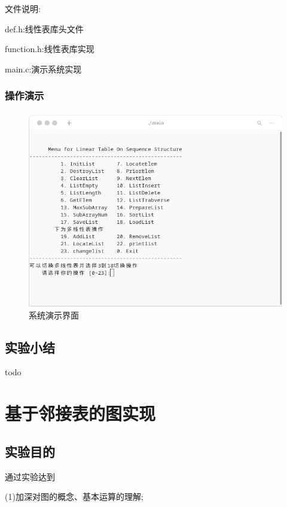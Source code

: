 \documentclass[supercite]{Experimental_Report}
\theoremstyle{definition}
\begin{document}
文件说明:

def.h:线性表库头文件

function.h:线性表库实现

main.c:演示系统实现

\subsubsection{操作演示}

\begin{figure}[htb]
	\begin{center}
		\includegraphics[scale=0.60]{images/1-1.png}
		\caption{系统演示界面}
		\label{fig1-1}
		\end{center}
\end{figure}

\subsection{实验小结}

todo

\newpage

\section{基于邻接表的图实现}

\subsection{实验目的}

通过实验达到

(1)加深对图的概念、基本运算的理解;
\end{document}
